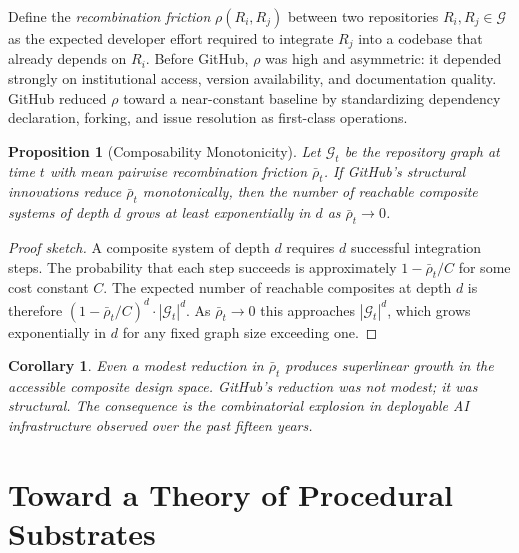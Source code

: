 \documentclass[11pt]{article}
\newtheorem{proposition}[theorem]{Proposition}
\newtheorem{corollary}[theorem]{Corollary}
\begin{document}
Define the \emph{recombination friction} $\rho(R_i, R_j)$ between two
repositories $R_i, R_j \in \mathcal{G}$ as the expected developer effort
required to integrate $R_j$ into a codebase that already depends on $R_i$.
Before GitHub, $\rho$ was high and asymmetric: it depended strongly on
institutional access, version availability, and documentation quality. GitHub
reduced $\rho$ toward a near-constant baseline by standardizing dependency
declaration, forking, and issue resolution as first-class operations.

\begin{proposition}[Composability Monotonicity]
Let $\mathcal{G}_t$ be the repository graph at time $t$ with mean pairwise
recombination friction $\bar\rho_t$. If GitHub's structural innovations reduce
$\bar\rho_t$ monotonically, then the number of reachable composite systems of
depth $d$ grows at least exponentially in $d$ as $\bar\rho_t \to 0$.
\end{proposition}

\begin{proof}[Proof sketch]
A composite system of depth $d$ requires $d$ successful integration steps. The
probability that each step succeeds is approximately $1 - \bar\rho_t / C$ for
some cost constant $C$. The expected number of reachable composites at depth
$d$ is therefore $(1 - \bar\rho_t/C)^d \cdot |\mathcal{G}_t|^d$. As
$\bar\rho_t \to 0$ this approaches $|\mathcal{G}_t|^d$, which grows
exponentially in $d$ for any fixed graph size exceeding one.
\end{proof}

\begin{corollary}
Even a modest reduction in $\bar\rho_t$ produces superlinear growth in the
accessible composite design space. GitHub's reduction was not modest; it was
structural. The consequence is the combinatorial explosion in deployable AI
infrastructure observed over the past fifteen years.
\end{corollary}


\section{Toward a Theory of Procedural Substrates}
\label{sec:procedural-substrates}
\end{document}
